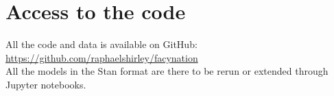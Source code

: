 \documentclass[12pt]{article}
\begin{document}


\appendix


\section{Access to the code}
\label{sec:model_descrip_appendix}

All the code and data is available on GitHub:\\

\url{https://github.com/raphaelshirley/facynation}\\ 

All the models in the Stan format are there to be rerun or extended through Jupyter notebooks. 





\label{lastpage}
\end{document}
